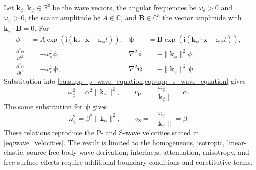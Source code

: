 Let $\mathbf{k}_\phi, \mathbf{k}_\psi \in \mathbb{R}^{3}$ be the wave vectors,
the angular frequencies be $\omega_\phi > 0$ and $\omega_\psi > 0$, the scalar
amplitude be $A\in\mathbb{C}$, and $\mathbf{B}\in\mathbb{C}^{3}$ the vector
amplitude with $\mathbf{k}_\psi \cdot \mathbf{B} = 0$. For
\begin{equation*}
  \begin{aligned}
    \phi & = A\exp\!\left(\mathrm{i}(\mathbf{k}_\phi \cdot \mathbf{x} -
    \omega_\phi t)\right),
    &\boldsymbol{\psi} & = \mathbf{B}\exp\!\left(
    \mathrm{i}(\mathbf{k}_\psi \cdot \mathbf{x} - \omega_\psi t)\right), \\
    \frac{\partial^2\phi}{\partial t^2} & = -\omega_\phi^2\phi,
    &\nabla^2\phi & = -\lVert\mathbf{k}_\phi\rVert^2\phi, \\
    \frac{\partial^2\boldsymbol{\psi}}{\partial t^2}
    & = -\omega_\psi^2\boldsymbol{\psi},
    &\nabla^2\boldsymbol{\psi}
    & = -\lVert\mathbf{k}_\psi\rVert^2\boldsymbol{\psi}.
  \end{aligned}
\end{equation*}
Substitution into \cref{eq:supp_p_wave_equation,eq:supp_s_wave_equation} gives
\begin{equation}
  \omega_\phi^2 = \alpha^2\lVert\mathbf{k}_\phi\rVert^2,
  \qquad v_{\mathrm{P}} =
  \frac{\omega_\phi}{\lVert\mathbf{k}_\phi\rVert} = \alpha.
  \label{eq:supp_p_dispersion}
\end{equation}
The same substitution for $\boldsymbol{\psi}$ gives
\begin{equation}
  \omega_\psi^2 = \beta^2\lVert\mathbf{k}_\psi\rVert^2,
  \qquad v_{\mathrm{S}} =
  \frac{\omega_\psi}{\lVert\mathbf{k}_\psi\rVert} = \beta.
  \label{eq:supp_s_dispersion}
\end{equation}
These relations reproduce the P- and S-wave velocities stated in
\cref{eq:wave_velocities}. The result is limited to the homogeneous,
isotropic, linear-elastic, source-free body-wave derivation; interfaces,
attenuation, anisotropy, and free-surface effects require additional boundary
conditions and constitutive terms.
